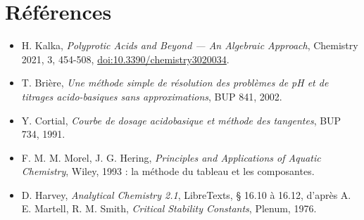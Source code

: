 \documentclass[a4paper,11pt]{article}
\begin{document}
\section*{Références}
\begin{itemize}
\item H. Kalka, \emph{Polyprotic Acids and Beyond — An Algebraic Approach}, Chemistry 2021, 3, 454-508, \href{https://doi.org/10.3390/chemistry3020034}{doi:10.3390/chemistry3020034}.
\item T. Brière, \emph{Une méthode simple de résolution des problèmes de pH et de titrages acido-basiques sans approximations}, BUP 841, 2002.
\item Y. Cortial, \emph{Courbe de dosage acidobasique et méthode des tangentes}, BUP 734, 1991.
\item F. M. M. Morel, J. G. Hering, \emph{Principles and Applications of Aquatic Chemistry}, Wiley, 1993 : la méthode du tableau et les composantes.
\item D. Harvey, \emph{Analytical Chemistry 2.1}, LibreTexts, § 16.10 à 16.12, d'après A. E. Martell, R. M. Smith, \emph{Critical Stability Constants}, Plenum, 1976.
\end{itemize}
\end{document}
